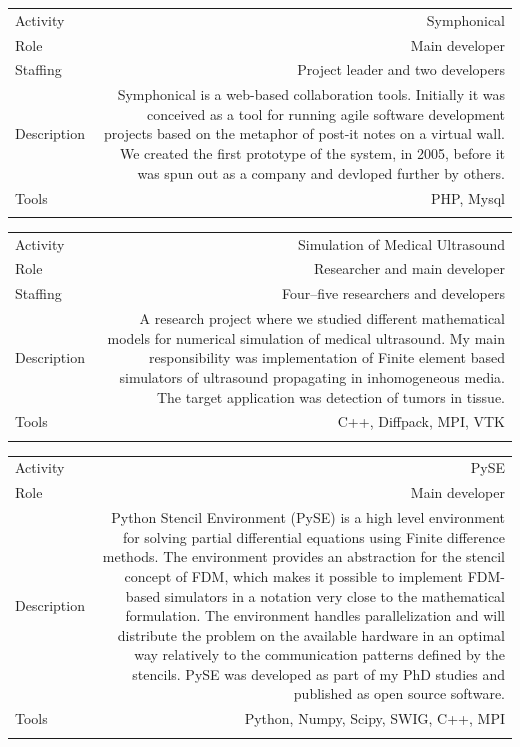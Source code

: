 \documentclass[english,a4paper,11pt]{article}
\begin{document}
\begin{tabular}{@{}LR}
Activity & Symphonical \\
Role & Main developer \\
Staffing & Project leader and two developers \\
Description & Symphonical is a web-based collaboration tools. Initially it was
conceived as a tool for running agile software development projects based on the
metaphor of post-it notes on a virtual wall. We created the first prototype 
of the system, in 2005, before it was spun out as a company and devloped further
by others. \\
Tools & PHP, Mysql \\
\addlinespace \bottomrule[.1pt] \addlinespace
\end{tabular}

\begin{tabular}{@{}LR}
Activity & Simulation of Medical Ultrasound \\
Role & Researcher and main developer \\
Staffing & Four--five researchers and developers \\
Description & A research project where we studied different mathematical models
for numerical simulation of medical ultrasound. My main responsibility was
implementation of Finite element based simulators of ultrasound propagating in
inhomogeneous media. The target application was detection of tumors in tissue. \\
Tools & C++, Diffpack, MPI, VTK \\
\addlinespace \bottomrule[.1pt] \addlinespace
\end{tabular}

\begin{tabular}{@{}LR}
Activity & PySE \\
Role & Main developer \\
Description & Python Stencil Environment (PySE) is a high level environment for
solving partial differential equations using Finite difference methods. The
environment provides an abstraction for the stencil concept of FDM, which makes
it possible to implement FDM-based simulators in a notation very close to the
mathematical formulation. The environment handles parallelization and will
distribute the problem on the available hardware in an optimal way relatively to
the communication patterns defined by the stencils. PySE was
developed as part of my PhD studies and published as open source software.
\\
Tools & Python, Numpy, Scipy, SWIG, C++, MPI \\
\addlinespace \bottomrule[.1pt] \addlinespace
\end{tabular}
\end{document}
